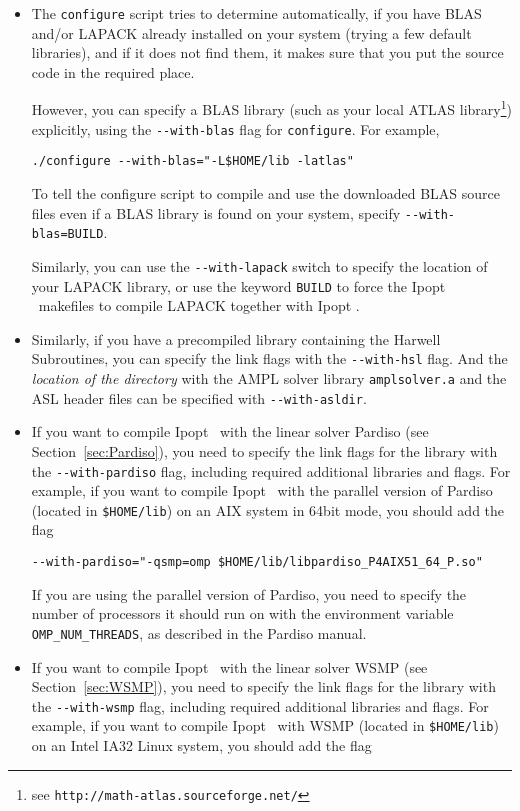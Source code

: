 \documentclass[10pt]{article}
\newcommand{\Ipopt}{{\sc Ipopt }}
\begin{document}
\begin{itemize}
\item The {\tt configure} script tries to determine automatically, if
  you have BLAS and/or LAPACK already installed on your system (trying
  a few default libraries), and if it does not find them, it makes
  sure that you put the source code in the required place.

  However, you can specify a BLAS library (such as your local ATLAS
  library\footnote{see {\tt http://math-atlas.sourceforge.net/}})
  explicitly, using the \verb/--with-blas/ flag for {\tt configure}.
  For example,

  \verb|./configure --with-blas="-L$HOME/lib -latlas"|

  To tell the configure script to compile and use the downloaded BLAS
  source files even if a BLAS library is found on your system, specify
  \verb|--with-blas=BUILD|.

  Similarly, you can use the \verb/--with-lapack/ switch to specify
  the location of your LAPACK library, or use the keyword {\tt BUILD}
  to force the \Ipopt\ makefiles to compile LAPACK together with
  \Ipopt.

\item Similarly, if you have a precompiled library containing the
  Harwell Subroutines, you can specify the link flags with the
  \verb|--with-hsl| flag.  And the \emph{location of the directory}
  with the AMPL solver library {\tt amplsolver.a} and the ASL header
  files can be specified with \verb|--with-asldir|.

\item If you want to compile \Ipopt\ with the linear solver Pardiso
  (see Section~\ref{sec:Pardiso}), you need to specify the link flags
  for the library with the \verb|--with-pardiso| flag, including
  required additional libraries and flags.  For example, if you want
  to compile \Ipopt\ with the parallel version of Pardiso (located in
  {\tt \$HOME/lib}) on an AIX system in 64bit mode, you should add the
  flag

  \verb|--with-pardiso="-qsmp=omp $HOME/lib/libpardiso_P4AIX51_64_P.so"|

  If you are using the parallel version of Pardiso, you need to
  specify the number of processors it should run on with the
  environment variable \verb|OMP_NUM_THREADS|, as described in the
  Pardiso manual.

\item If you want to compile \Ipopt\ with the linear solver WSMP (see
  Section~\ref{sec:WSMP}), you need to specify the link flags for the
  library with the \verb|--with-wsmp| flag, including required
  additional libraries and flags.  For example, if you want to compile
  \Ipopt\ with WSMP (located in {\tt \$HOME/lib}) on an Intel IA32
  Linux system, you should add the flag


\end{itemize}
\end{document}
